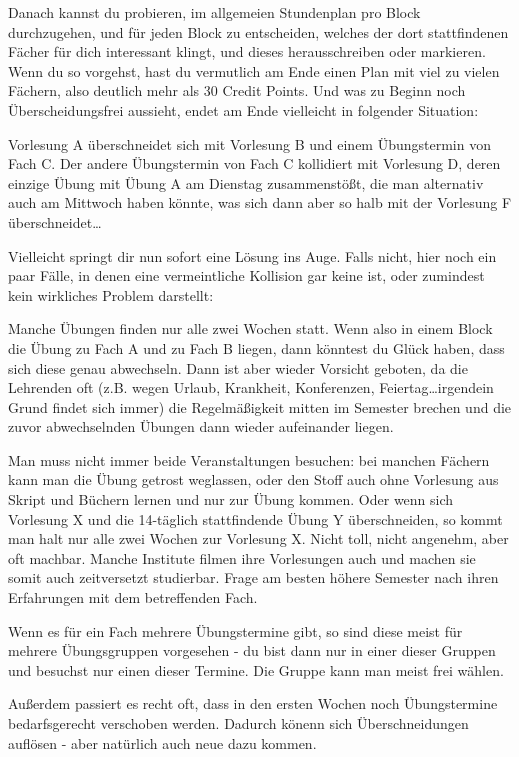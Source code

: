 Danach kannst du probieren, im allgemeien Stundenplan pro Block durchzugehen, und für jeden Block zu entscheiden, welches der dort stattfindenen Fächer für dich interessant klingt, und dieses herausschreiben oder markieren. Wenn du so vorgehst, hast du vermutlich am Ende einen Plan mit viel zu vielen Fächern, also deutlich mehr als 30 Credit Points. Und was zu Beginn noch Überscheidungsfrei aussieht, endet am Ende vielleicht in folgender Situation:

Vorlesung A überschneidet sich mit Vorlesung B und einem Übungstermin von Fach C. Der andere Übungstermin von Fach C kollidiert mit Vorlesung D, deren einzige Übung mit Übung A am Dienstag zusammenstößt, die man alternativ auch am Mittwoch haben könnte, was sich dann aber so halb mit der Vorlesung F überschneidet\ldots

Vielleicht springt dir nun sofort eine Lösung ins Auge. Falls nicht, hier noch ein paar Fälle, in denen eine vermeintliche Kollision gar keine ist, oder zumindest kein wirkliches Problem darstellt:

Manche Übungen finden nur alle zwei Wochen statt. Wenn also in einem Block die Übung zu Fach A und zu Fach B liegen, dann könntest du Glück haben, dass sich diese genau abwechseln. Dann ist aber wieder Vorsicht geboten, da die Lehrenden oft (z.B. wegen Urlaub, Krankheit, Konferenzen, Feiertag\ldots irgendein Grund findet sich immer) die Regelmäßigkeit mitten im Semester brechen und die zuvor abwechselnden Übungen dann wieder aufeinander liegen.

Man muss nicht immer beide Veranstaltungen besuchen: bei manchen Fächern kann man die Übung getrost weglassen, oder den Stoff auch ohne Vorlesung aus Skript und Büchern lernen und nur zur Übung kommen. Oder wenn sich Vorlesung X und die 14-täglich stattfindende Übung Y überschneiden, so kommt man halt nur alle zwei Wochen zur Vorlesung X. Nicht toll, nicht angenehm, aber oft machbar. Manche Institute filmen ihre Vorlesungen auch und machen sie somit auch zeitversetzt studierbar. Frage am besten höhere Semester nach ihren Erfahrungen mit dem betreffenden Fach.

Wenn es für ein Fach mehrere Übungstermine gibt, so sind diese meist für mehrere Übungsgruppen vorgesehen - du bist dann nur in einer dieser Gruppen und besuchst nur einen dieser Termine. Die Gruppe kann man meist frei wählen.

Außerdem passiert es recht oft, dass in den ersten Wochen noch Übungstermine bedarfsgerecht verschoben werden. Dadurch könenn sich Überschneidungen auflösen - aber natürlich auch neue dazu kommen.

